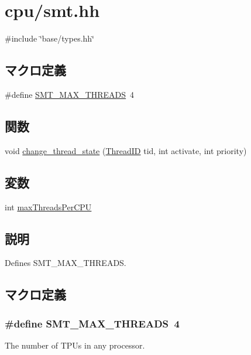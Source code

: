 \hypertarget{smt_8hh}{
\section{cpu/smt.hh}
\label{smt_8hh}
}
{\ttfamily \#include \char`\"{}base/types.hh\char`\"{}}\par
\subsection*{マクロ定義}
\begin{DoxyCompactItemize}
\item 
\#define \hyperlink{smt_8hh_a6612deb5867dd1b4ed5945107af3cf02}{SMT\_\-MAX\_\-THREADS}~4
\end{DoxyCompactItemize}
\subsection*{関数}
\begin{DoxyCompactItemize}
\item 
void \hyperlink{smt_8hh_aaebae07f0ebacbf1a4b445bc46cf4bc7}{change\_\-thread\_\-state} (\hyperlink{base_2types_8hh_ab39b1a4f9dad884694c7a74ed69e6a6b}{ThreadID} tid, int activate, int priority)
\end{DoxyCompactItemize}
\subsection*{変数}
\begin{DoxyCompactItemize}
\item 
int \hyperlink{smt_8hh_a62067bc668811dd5f1bc6522bc600d56}{maxThreadsPerCPU}
\end{DoxyCompactItemize}


\subsection{説明}
Defines SMT\_\-MAX\_\-THREADS. 

\subsection{マクロ定義}
\hypertarget{smt_8hh_a6612deb5867dd1b4ed5945107af3cf02}{
\subsubsection[{SMT\_\-MAX\_\-THREADS}]{\setlength{\rightskip}{0pt plus 5cm}\#define SMT\_\-MAX\_\-THREADS~4}}
\label{smt_8hh_a6612deb5867dd1b4ed5945107af3cf02}
The number of TPUs in any processor. 

